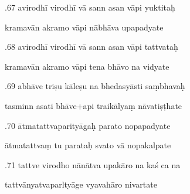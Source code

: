 \documentclass[article,12pt,a4paper]{memoir}%
\newcounter{parCount}
\begin{document}
	  
	  \pstart {}.67 avirodhī virodhī vā sann asan vāpi yuktitaḥ 
	{}
	\pend%
      

	  
	  \pstart \leavevmode%
	kramavān akramo vāpi nābhāva upapadyate 
	{}
	\pend%
      

	  
	  \pstart {}.68 avirodhī virodhī vā sann asan vāpi tattvataḥ 
	{}
	\pend%
      

	  
	  \pstart \leavevmode%
	kramavān akramo vāpi tena bhāvo na vidyate 
	{}
	\pend%
      

	  
	  \pstart {}.69 abhāve triṣu kāleṣu na bhedasyāsti saṃbhavaḥ 
	{}
	\pend%
      

	  
	  \pstart \leavevmode%
	tasminn asati bhāve+api traikālyaṃ nāvatiṣṭhate 
	{}
	\pend%
      

	  
	  \pstart {}.70 ātmatattvaparityāgaḥ parato nopapadyate 
	{}
	\pend%
      

	  
	  \pstart \leavevmode%
	ātmatattvaṃ tu parataḥ svato vā nopakalpate 
	{}
	\pend%
      

	  
	  \pstart {}.71 tattve virodho nānātva upakāro na kaś ca na 
	{}
	\pend%
      

	  
	  \pstart \leavevmode%
	tattvānyatvaparltyāge vyavahāro nivartate 
	{}
	\pend%
      
\end{document}
